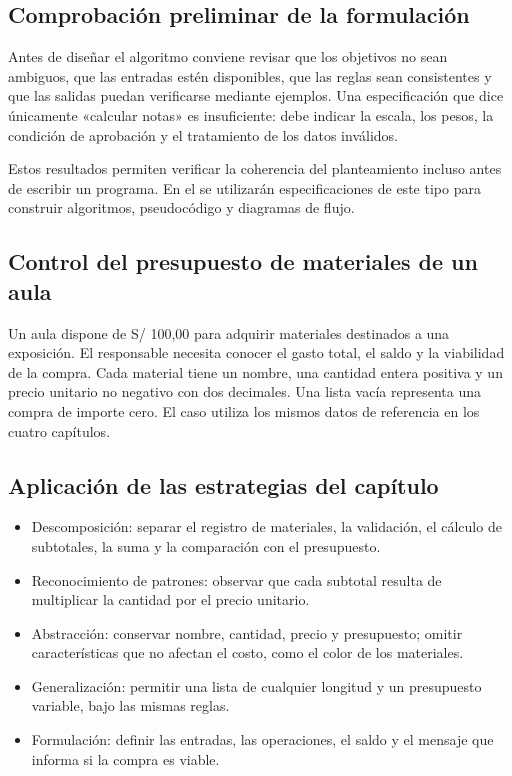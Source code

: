 \subsection{Comprobación preliminar de la formulación}

Antes de diseñar el algoritmo conviene revisar que los objetivos no sean ambiguos, que las entradas estén disponibles, que las reglas sean consistentes y que las salidas puedan verificarse mediante ejemplos. Una especificación que dice únicamente «calcular notas» es insuficiente: debe indicar la escala, los pesos, la condición de aprobación y el tratamiento de los datos inválidos.



Estos resultados permiten verificar la coherencia del planteamiento incluso antes de escribir un programa. En el  se utilizarán especificaciones de este tipo para construir algoritmos, pseudocódigo y diagramas de flujo.


\subsection{Control del presupuesto de materiales de un aula}

Un aula dispone de S/ 100,00 para adquirir materiales destinados a una exposición. El responsable necesita conocer el gasto total, el saldo y la viabilidad de la compra. Cada material tiene un nombre, una cantidad entera positiva y un precio unitario no negativo con dos decimales. Una lista vacía representa una compra de importe cero. El caso utiliza los mismos datos de referencia en los cuatro capítulos.



\subsection{Aplicación de las estrategias del capítulo}

\begin{itemize}
\item Descomposición: separar el registro de materiales, la validación, el cálculo de subtotales, la suma y la comparación con el presupuesto.
\item Reconocimiento de patrones: observar que cada subtotal resulta de multiplicar la cantidad por el precio unitario.
\item Abstracción: conservar nombre, cantidad, precio y presupuesto; omitir características que no afectan el costo, como el color de los materiales.
\item Generalización: permitir una lista de cualquier longitud y un presupuesto variable, bajo las mismas reglas.
\item Formulación: definir las entradas, las operaciones, el saldo y el mensaje que informa si la compra es viable.
\end{itemize}

